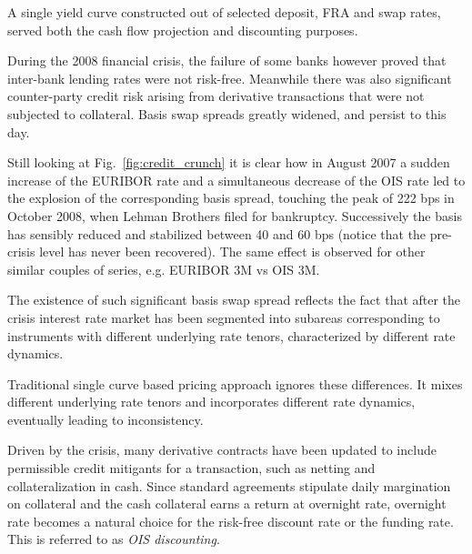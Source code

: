 A single yield curve constructed out of selected deposit, FRA and swap rates, served both the cash flow projection and discounting purposes.

During the 2008 financial crisis, the failure of some banks however proved that inter-bank lending rates were not risk-free. Meanwhile there was also significant counter-party credit risk arising from derivative transactions that were not subjected to collateral. Basis swap spreads greatly widened, and persist to this day. 

Still looking at Fig.~\ref{fig:credit_crunch} it is clear how in August 2007 a sudden increase of the EURIBOR rate and a simultaneous decrease of the OIS rate led to the explosion of the corresponding basis spread, touching the peak of 222 bps in October 2008, when Lehman Brothers filed for bankruptcy. Successively the basis has sensibly reduced and stabilized between 40 and 60 bps (notice that the pre-crisis level has never been recovered). The same effect is observed for other similar couples of series, e.g. EURIBOR 3M vs OIS 3M.

The existence of such significant basis swap spread reflects the fact that after the crisis interest rate market has been segmented into subareas corresponding to instruments with different underlying rate tenors, characterized by different rate dynamics. 

Traditional single curve based pricing approach ignores these differences. It mixes different underlying rate tenors and incorporates different rate dynamics, eventually leading to inconsistency.

Driven by the crisis, many derivative contracts have been updated to include permissible credit mitigants for a transaction, such as netting and collateralization in cash. Since standard agreements stipulate daily margination on collateral and the cash collateral earns a return at overnight rate, overnight rate becomes a natural choice for the risk-free discount rate or the funding rate. This is referred to as \emph{OIS discounting}.

